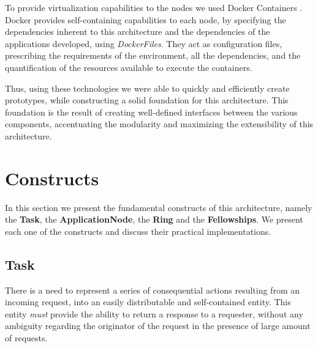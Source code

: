 \documentclass[12pt, titlepage]{uo_temp}
\begin{document}
     To provide virtualization capabilities to the nodes we used Docker Containers
     \cite{docker}. Docker provides self-containing capabilities to each node, by
     specifying the dependencies inherent to this architecture and the dependencies of the
     applications developed, using \emph{DockerFiles}. They act as configuration files,
     prescribing the requirements of the environment, all the dependencies, and the
     quantification of the resources available to execute the containers.

     Thus, using these technologies we were able to quickly and efficiently create
     prototypes, while constructing a solid foundation for this architecture. This
     foundation is the result of creating well-defined interfaces between the various
     components, accentuating the modularity and maximizing the extensibility of this
     architecture.

     \section{Constructs}
     In this section we present the fundamental constructs of this architecture, namely
     the \textbf{Task}, the \textbf{ApplicationNode}, the \textbf{Ring} and the
     \textbf{Fellowships}.  We present each one of the constructs and discuss their
     practical implementations.

     \subsection{Task}\label{impl_constructs_task}
     There is a need to represent a series of consequential actions resulting from an
     incoming request, into an easily distributable and self-contained entity. This entity
     \emph{must} provide the ability to return a response to a requester, without any
     ambiguity regarding the originator of the request in the presence of large amount of
     requests.
     
\end{document}
